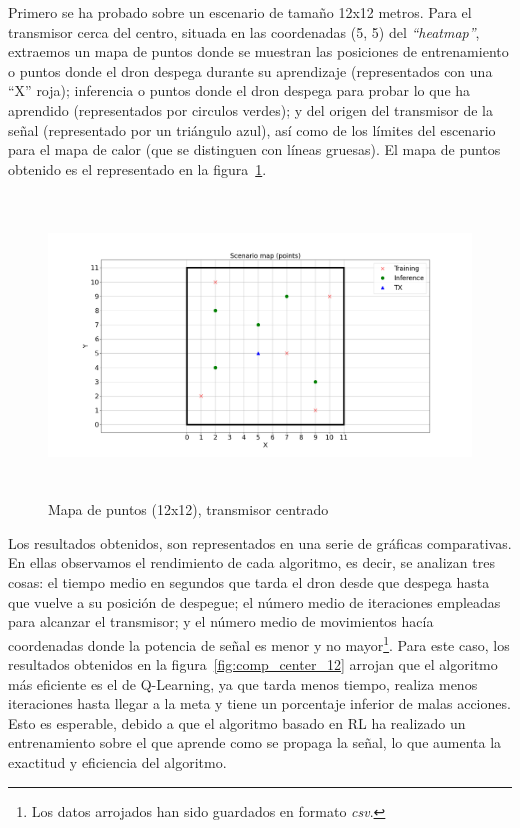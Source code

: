 Primero se ha probado sobre un escenario de tamaño 12x12 metros. Para el transmisor cerca del centro, situada en las coordenadas (5, 5) del \emph{``heatmap''}, extraemos un mapa de puntos donde se muestran las posiciones de entrenamiento o puntos donde el dron despega durante su aprendizaje (representados con una ``X'' roja); inferencia o puntos donde el dron despega para probar lo que ha aprendido (representados por circulos verdes); y del origen del transmisor de la señal (representado por un triángulo azul), así como de los límites del escenario para el mapa de calor (que se distinguen con líneas gruesas). El mapa de puntos obtenido es el representado en la figura~\ref{fig:map_p_center_12}.\\

\begin{figure} [t]
    \begin{center}
    \includegraphics[height=8cm]{imagenes/cap4/17_mapa_p_centro_12.png}
    \end{center}
    \caption[Mapa de puntos (12x12), transmisor centrado]{Mapa de puntos (12x12), transmisor centrado}
    \label{fig:map_p_center_12}
\end{figure}

Los resultados obtenidos, son representados en una serie de gráficas comparativas. En ellas observamos el rendimiento de cada algoritmo, es decir, se analizan tres cosas: el tiempo medio en segundos que tarda el dron desde que despega hasta que vuelve a su posición de despegue; el número medio de iteraciones empleadas para alcanzar el transmisor; y el número medio de movimientos hacía coordenadas donde la potencia de señal es menor y no mayor\footnote[5]{Los datos arrojados han sido guardados en formato \emph{csv}.}.  Para este caso, los resultados obtenidos en la figura~\ref{fig:comp_center_12} arrojan que el algoritmo más eficiente es el de Q-Learning, ya que tarda menos tiempo, realiza menos iteraciones hasta llegar a la meta y tiene un porcentaje inferior de malas acciones. Esto es esperable, debido a que el algoritmo basado en \ac{RL} ha realizado un entrenamiento sobre el que aprende como se propaga la señal, lo que aumenta la exactitud y eficiencia del algoritmo.\\

